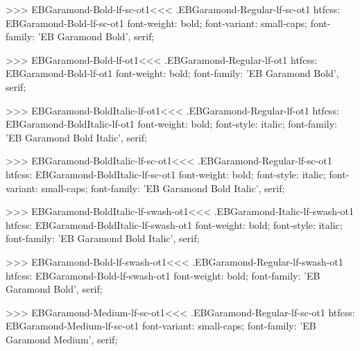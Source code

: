 {{{{{{{>>>
\<EBGaramond-Bold-lf-sc-ot1\><<<
.EBGaramond-Regular-lf-sc-ot1
htfcss:  EBGaramond-Bold-lf-sc-ot1  font-weight: bold; font-variant: small-caps; font-family: 'EB Garamond Bold', serif;

>>>
\<EBGaramond-Bold-lf-ot1\><<<
.EBGaramond-Regular-lf-ot1
htfcss:  EBGaramond-Bold-lf-ot1  font-weight: bold; font-family: 'EB Garamond Bold', serif;

>>>
\<EBGaramond-BoldItalic-lf-ot1\><<<
.EBGaramond-Regular-lf-ot1
htfcss:  EBGaramond-BoldItalic-lf-ot1  font-weight: bold; font-style: italic; font-family: 'EB Garamond Bold Italic', serif;

>>>
\<EBGaramond-BoldItalic-lf-sc-ot1\><<<
.EBGaramond-Regular-lf-sc-ot1
htfcss:  EBGaramond-BoldItalic-lf-sc-ot1  font-weight: bold; font-style: italic; font-variant: small-caps; font-family: 'EB Garamond Bold Italic', serif;

>>>
\<EBGaramond-BoldItalic-lf-swash-ot1\><<<
.EBGaramond-Italic-lf-swash-ot1
htfcss:  EBGaramond-BoldItalic-lf-swash-ot1  font-weight: bold; font-style: italic; font-family: 'EB Garamond Bold Italic', serif;

>>>
\<EBGaramond-Bold-lf-swash-ot1\><<<
.EBGaramond-Regular-lf-swash-ot1
htfcss:  EBGaramond-Bold-lf-swash-ot1  font-weight: bold; font-family: 'EB Garamond Bold', serif;

>>>
\<EBGaramond-Medium-lf-sc-ot1\><<<
.EBGaramond-Regular-lf-sc-ot1
htfcss:  EBGaramond-Medium-lf-sc-ot1  font-variant: small-caps; font-family: 'EB Garamond Medium', serif;

}}}}}}}
